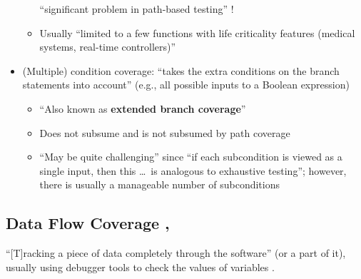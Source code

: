 \begin{itemize}
\begin{itemize}
                    ``significant problem in path-based testing''
                    \citep[p.~5-5]{SWEBOK2024}!
              \item Usually ``limited to a few functions with life
                    criticality features (medical systems, real-time
                    controllers)'' \citep[p.~481]{PetersAndPedrycz2000}
          \end{itemize}
    \item (Multiple) condition coverage: ``takes the extra conditions on the
          branch statements into account'' (e.g., all possible inputs to a
          Boolean expression) \citep[p.~120]{Patton2006}
          \begin{itemize}
              \item ``Also known as \textbf{extended branch coverage}''
                    \citep[p.~422]{vanVliet2000}
              \item Does not subsume and is not subsumed by path coverage
                    \citep[p.~433]{vanVliet2000}
              \item ``May be quite challenging'' since ``if each
                    subcondition is viewed as a single input, then this
                    \dots\ is analogous to exhaustive testing''; however,
                    there is usually a manageable number of subconditions
                    \citep[p.~464]{PetersAndPedrycz2000}
          \end{itemize}
\end{itemize}

\subsection[Data Flow Coverage]{Data Flow Coverage \citep[p.~114]{Patton2006},
    \citep[pp.~424-425]{vanVliet2000}}
\label{data-flow-coverage}

``[T]racking a piece of data completely through the software'' (or a part of
it), usually using debugger tools to check the values of variables
\citep[p.~114]{Patton2006}.

